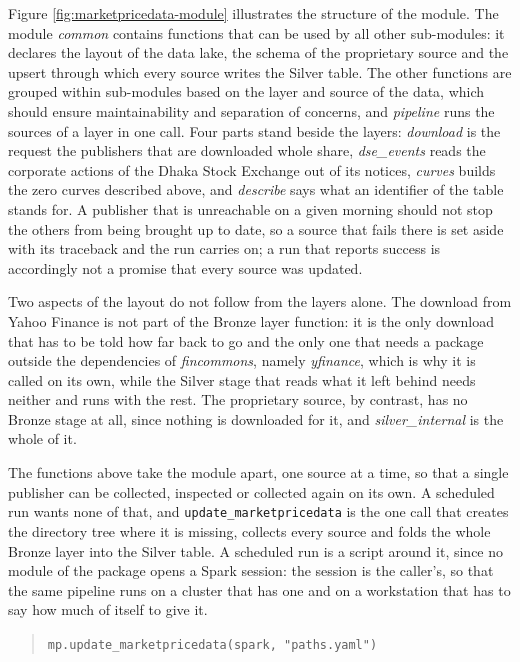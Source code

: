 Figure \ref{fig:marketpricedata-module} illustrates the structure of the module. The module \emph{common} contains functions that can be used by all other sub-modules: it declares the layout of the data lake, the schema of the proprietary source and the upsert through which every source writes the Silver table. The other functions are grouped within sub-modules based on the layer and source of the data, which should ensure maintainability and separation of concerns, and \emph{pipeline} runs the sources of a layer in one call. Four parts stand beside the layers: \emph{download} is the request the publishers that are downloaded whole share, \emph{dse\_events} reads the corporate actions of the Dhaka Stock Exchange out of its notices, \emph{curves} builds the zero curves described above, and \emph{describe} says what an identifier of the table stands for. A publisher that is unreachable on a given morning should not stop the others from being brought up to date, so a source that fails there is set aside with its traceback and the run carries on; a run that reports success is accordingly not a promise that every source was updated.

Two aspects of the layout do not follow from the layers alone. The download from Yahoo Finance is not part of the Bronze layer function: it is the only download that has to be told how far back to go and the only one that needs a package outside the dependencies of \emph{fincommons}, namely \emph{yfinance}, which is why it is called on its own, while the Silver stage that reads what it left behind needs neither and runs with the rest. The proprietary source, by contrast, has no Bronze stage at all, since nothing is downloaded for it, and \emph{silver\_internal} is the whole of it.

The functions above take the module apart, one source at a time, so that a single publisher can be collected, inspected or collected again on its own. A scheduled run wants none of that, and \verb|update_marketpricedata| is the one call that creates the directory tree where it is missing, collects every source and folds the whole Bronze layer into the Silver table. A scheduled run is a script around it, since no module of the package opens a Spark session: the session is the caller's, so that the same pipeline runs on a cluster that has one and on a workstation that has to say how much of itself to give it.

\begin{quote}
\verb|mp.update_marketpricedata(spark, "paths.yaml")|
\end{quote}

